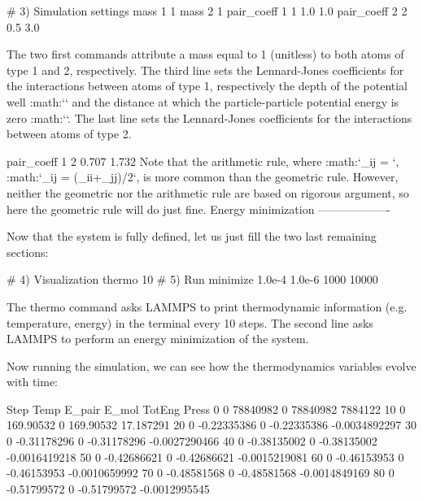 \begin{lcverbatim}
# 3) Simulation settings
mass 1 1
mass 2 1
pair_coeff 1 1 1.0 1.0
pair_coeff 2 2 0.5 3.0
\end{lcverbatim}

The two first commands attribute a mass
equal to 1 (unitless) to both atoms of type 1 and 2,
respectively. The third line sets the Lennard-Jones
coefficients for the interactions between atoms of type 1,
respectively the depth of the potential well
:math:`\epsilon` and the distance at which the
particle-particle potential energy is zero :math:`\sigma`. 
The last line sets the Lennard-Jones coefficients for
the interactions between atoms of type 2.


\begin{lcverbatim}
pair_coeff 1 2 0.707 1.732 
Note that the arithmetic rule, where 
:math:`\epsilon_{ij} = `,
:math:`\sigma_{ij} = (\sigma_{ii}+\sigma_{jj})/2`, 
is more common than the geometric rule. However, neither the geometric nor the
arithmetic rule are based on rigorous argument, so here
the geometric rule will do just fine. 
Energy minimization
-------------------
\end{lcverbatim}

Now that the system is fully defined, let us just fill the two last remaining sections:

\begin{lcverbatim}
# 4) Visualization
thermo 10
# 5) Run
minimize 1.0e-4 1.0e-6 1000 10000
\end{lcverbatim}

The thermo command asks LAMMPS to print
thermodynamic information (e.g. temperature, energy) in the
terminal every 10 steps. The second line asks LAMMPS to
perform an energy minimization of the system.


Now running the simulation, we can see how the thermodynamics
variables evolve with time:

\begin{lcverbatim}
Step         Temp       E_pair        E_mol       TotEng         Press
0            0     78840982            0     78840982       7884122 
10            0    169.90532            0    169.90532     17.187291 
20            0  -0.22335386            0  -0.22335386 -0.0034892297 
30            0  -0.31178296            0  -0.31178296 -0.0027290466 
40            0  -0.38135002            0  -0.38135002 -0.0016419218 
50            0  -0.42686621            0  -0.42686621 -0.0015219081 
60            0  -0.46153953            0  -0.46153953 -0.0010659992 
70            0  -0.48581568            0  -0.48581568 -0.0014849169 
80            0  -0.51799572            0  -0.51799572 -0.0012995545 
\end{lcverbatim}

